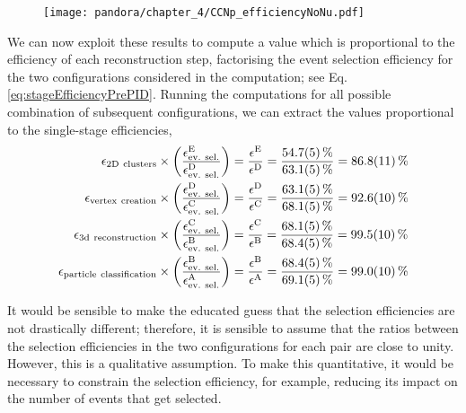\begin{figure}
    \centering
    \texttt{[image: pandora/chapter\_4/CCNp\_efficiencyNoNu.pdf]}
    \caption[Evaluation of the reconstruction and selection efficiency for different configurations]{}
    \label{fig:efficiencyNoNu}
\end{figure}

We can now exploit these results to compute a value which is proportional to the efficiency of each reconstruction step, factorising the event selection efficiency for the two configurations considered in the computation; see Eq. \eqref{eq:stageEfficiencyPrePID}. Running the computations for all possible combination of subsequent configurations, we can extract the values proportional to the single-stage efficiencies, \begin{align}
    \epsilon_\mathrm{2D\ clusters} \times 
    \qty(\frac{\epsilon_\mathrm{ev.\ sel.}^\mathrm{E}}{\epsilon_\mathrm{ev.\ sel.}^\mathrm{D}}) 
    &= \frac{\epsilon^\mathrm{E}}{\epsilon^\mathrm{D}} = \frac{\SI{54.7(5)}{\percent}}{\SI{63.1(5)}{\percent}} = 
    \SI[round-mode = uncertainty]{86.779059+-1.104354}{\percent} \\
    \epsilon_\mathrm{vertex\ creation} 
    \times \qty(\frac{\epsilon_\mathrm{ev.\ sel.}^\mathrm{D}}{\epsilon_\mathrm{ev.\ sel.}^\mathrm{C}}) 
    &= \frac{\epsilon^\mathrm{D}}{\epsilon^\mathrm{C}} = \frac{\SI{63.1(5)}{\percent}}{\SI{68.1(5)}{\percent}} = 
    \SI[round-mode = uncertainty]{92.575370+-1.024352}{\percent} \\
    \epsilon_\mathrm{3d\ reconstruction} 
    \times \qty(\frac{\epsilon_\mathrm{ev.\ sel.}^\mathrm{C}}{\epsilon_\mathrm{ev.\ sel.}^\mathrm{B}}) 
    &= \frac{\epsilon^\mathrm{C}}{\epsilon^\mathrm{B}} = \frac{\SI{68.1(5)}{\percent}}{\SI{68.4(5)}{\percent}} = 
    \SI[round-mode = uncertainty]{99.526687+-1.041368}{\percent} \\
    \epsilon_\mathrm{particle\ classification} 
    \times \qty(\frac{\epsilon_\mathrm{ev.\ sel.}^\mathrm{B}}{\epsilon_\mathrm{ev.\ sel.}^\mathrm{A}}) 
    &= \frac{\epsilon^\mathrm{B}}{\epsilon^\mathrm{A}} = \frac{\SI{68.4(5)}{\percent}}{\SI{69.1(5)}{\percent}} = 
    \SI[round-mode = uncertainty]{99.039894+-1.024644}{\percent}
\end{align}

It would be sensible to make the educated guess that the selection efficiencies are not drastically different; therefore, it is sensible to assume that the ratios between the selection efficiencies in the two configurations for each pair are close to unity. However, this is a qualitative assumption. To make this quantitative, it would be necessary to constrain the selection efficiency, for example, reducing its impact on the number of events that get selected. 

